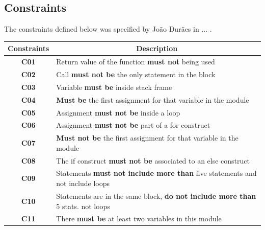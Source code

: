 \subsection{Constraints}

The constraints defined below was specified by João Durães in ... .

\begin{table}[ht]
\centering
\begin{tabular}{|c|l|}
\hline
\textbf{Constraints}            & \multicolumn{1}{c|}{\textbf{Description}}                                     \\ \hline \hline
\textbf{C01}       \label{C01}  & Return value of the function \textbf{must not} being used                              \\ \hline
\textbf{C02}       \label{C02}  & Call \textbf{must not be} the only statement in the block                              \\ \hline
\textbf{C03}       \label{C03}  & Variable \textbf{must be} inside stack frame                                           \\ \hline
\textbf{C04}       \label{C04}  & \textbf{Must be} the first assignment for that variable in the module                  \\ \hline
\textbf{C05}       \label{C05}  & Assignment \textbf{must not be} inside a loop                                          \\ \hline
\textbf{C06}       \label{C06}  & Assignment \textbf{must not be} part of a for construct                                \\ \hline
\textbf{C07}       \label{C07}  & \textbf{Must not be} the first assignment for that variable in the module              \\ \hline
\textbf{C08}       \label{C08}  & The if construct \textbf{must not be} associated to an else construct                  \\ \hline
\textbf{C09}       \label{C09}  & Statements \textbf{must not include more than} five statements and not include loops   \\ \hline
\textbf{C10}       \label{C010} & Statements are in the same block, \textbf{do not include more than} 5 stats. not loops \\ \hline
\textbf{C11}       \label{C011} & There \textbf{must be} at least two variables in this module                           \\ \hline
\end{tabular}
\end{table}

